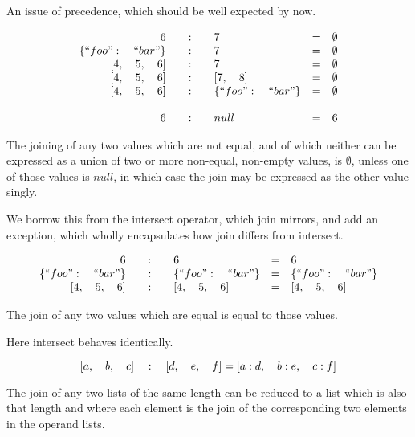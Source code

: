 \documentclass[letterpaper]{article}
\begin{document}
An issue of precedence, which should be well expected by now.

\begin{prule}
\begin{equation}
\begin{array}{rclcl}
6 \quad&:&\quad 7 & = & \emptyset \\
\{``foo":\quad``bar"\} \quad&:&\quad 7 & = & \emptyset \\
{[}4,\quad5,\quad6] \quad&:&\quad 7 & = & \emptyset \\
{[}4,\quad5,\quad6] \quad&:&\quad {[}7,\quad8] & = & \emptyset \\
{[}4,\quad5,\quad6] \quad&:&\quad \{``foo":\quad``bar"\} & = & \emptyset \\
\\
6 \quad&:&\quad null & = & 6 \\
\end{array}
\end{equation}

The joining of any two values which are not equal, and of which neither
can be expressed as a union of two or more non-equal, non-empty values, is
\(\emptyset\), unless one of those values is \(null\), in which case the join
may be expressed as the other value singly.
\end{prule}

We borrow this from the intersect operator, which join mirrors, and add an
exception, which wholly encapsulates how join differs from intersect.

\begin{prule}
\begin{equation}
\begin{array}{rclcl}
6 \quad&:&\quad 6 & = & 6 \\
\{``foo":\quad``bar"\} \quad&:&\quad \{``foo":\quad``bar"\}  & = & \{``foo":\quad``bar"\} \\
{[}4,\quad5,\quad6] \quad&:&\quad {[}4,\quad5,\quad6] & = & {[}4,\quad5,\quad6] \\
\end{array}
\end{equation}

The join of any two values which are equal is equal to those values.
\end{prule}

Here intersect behaves identically.

\begin{prule}
\begin{equation}
{[}a,\quad b,\quad c] \quad:\quad {[}d,\quad e,\quad f]  =  {[}a: d,\quad
b: e,\quad c: f] \\
\end{equation}

The join of any two lists of the same length can be reduced to a list
which is also that length and where each element is the join of the
corresponding two elements in the operand lists.
\end{prule}
\end{document}
